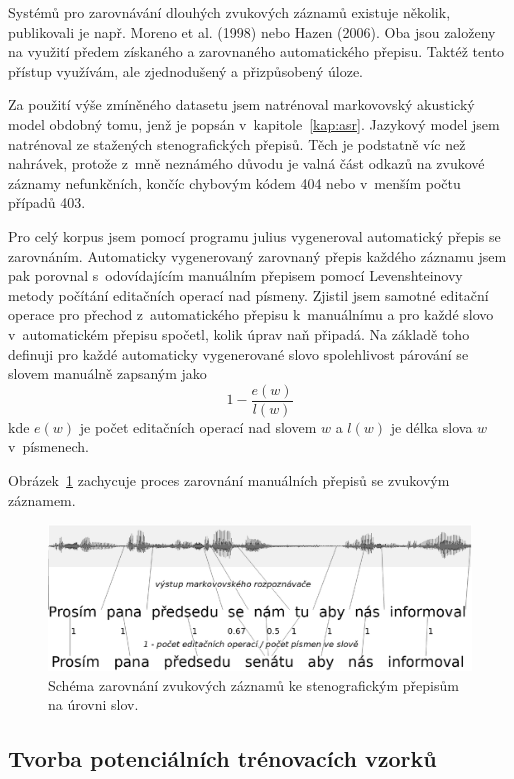 Systémů pro zarovnávání dlouhých zvukových záznamů existuje několik, publikovali
je např. Moreno et al. (1998)\cite{moreno1998recursive} nebo
Hazen (2006)\cite{hazen2006automatic}. Oba jsou založeny na využití předem získaného a
zarovnaného automatického přepisu. Taktéž tento přístup využívám, ale
zjednodušený a přizpůsobený úloze.

Za použití výše zmíněného datasetu\cite{pspdata} jsem natrénoval markovovský
akustický model obdobný tomu, jenž je popsán v~kapitole~\ref{kap:asr}. Jazykový
model jsem natrénoval ze stažených stenografických přepisů. Těch je podstatně
víc než nahrávek, protože z~mně neznámého důvodu je valná část odkazů na zvukové
záznamy nefunkčních, končíc chybovým kódem 404 nebo v~menším počtu případů 403.

Pro celý korpus jsem pomocí programu julius vygeneroval automatický přepis se
zarovnáním. Automaticky vygenerovaný zarovnaný přepis každého záznamu jsem pak
porovnal s~odovídajícím manuálním přepisem pomocí Levenshteinovy metody počítání
editačních operací nad písmeny. Zjistil jsem samotné editační operace pro přechod
z~automatického přepisu k~manuálnímu a pro každé slovo v~automatickém přepisu
spočetl, kolik úprav naň připadá. Na základě toho definuji pro každé automaticky
vygenerované slovo spolehlivost párování se slovem manuálně zapsaným jako
\begin{equation}1 - \frac{e(w)}{l(w)}\end{equation}
kde $e(w)$ je počet editačních operací nad slovem $w$ a $l(w)$ je délka slova
$w$ v~písmenech.

Obrázek~\ref{fig:svolocz:align} zachycuje proces zarovnání manuálních přepisů se
zvukovým záznamem.

\begin{figure}[htpb]
\includegraphics[scale=0.4]{rc/svolocz-align.eps}
\caption{Schéma zarovnání zvukových záznamů ke stenografickým přepisům na úrovni
slov.}
\label{fig:svolocz:align}
\end{figure}

\subsection{Tvorba potenciálních trénovacích vzorků}

